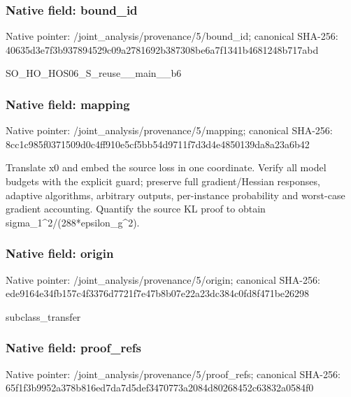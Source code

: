 \documentclass[10pt,a4paper]{article}
\begin{document}
\subsubsection{Native field: bound\_\allowbreak{}id}
Native pointer: /joint\_\allowbreak{}analysis/provenance/5/bound\_\allowbreak{}id; canonical SHA-256: 40635d3e7f3b937894529c09a2781692b387308be6a7f1341b4681248b717abd

\begingroup\raggedright\sloppy SO\_\allowbreak{}HO\_\allowbreak{}HOS06\_\allowbreak{}S\_\allowbreak{}reuse\_\allowbreak{}\_\allowbreak{}main\_\allowbreak{}\_\allowbreak{}b6\par\endgroup

\subsubsection{Native field: mapping}
Native pointer: /joint\_\allowbreak{}analysis/provenance/5/mapping; canonical SHA-256: 8cc1c985f0371509d0c4ff910e5cf5bb54d9711f7d3d4e4850139da8a23a6b42

\begingroup\raggedright\sloppy Translate x0 and embed the source loss in one coordinate. Verify all model budgets with the explicit guard;\allowbreak{} preserve full gradient/\allowbreak{}Hessian responses,\allowbreak{} adaptive algorithms,\allowbreak{} arbitrary outputs,\allowbreak{} per-instance probability and worst-case gradient accounting. Quantify the source KL proof to obtain sigma\_\allowbreak{}1\textasciicircum{}2/\allowbreak{}(288*epsilon\_\allowbreak{}g\textasciicircum{}2).\par\endgroup

\subsubsection{Native field: origin}
Native pointer: /joint\_\allowbreak{}analysis/provenance/5/origin; canonical SHA-256: ede9164e34fb157c4f3376d7721f7e47b8b07e22a23dc384c0fd8f471be26298

\begingroup\raggedright\sloppy subclass\_\allowbreak{}transfer\par\endgroup

\subsubsection{Native field: proof\_\allowbreak{}refs}
Native pointer: /joint\_\allowbreak{}analysis/provenance/5/proof\_\allowbreak{}refs; canonical SHA-256: 65f1f3b9952a378b816ed7da7d5def3470773a2084d80268452c63832a0584f0
\end{document}
